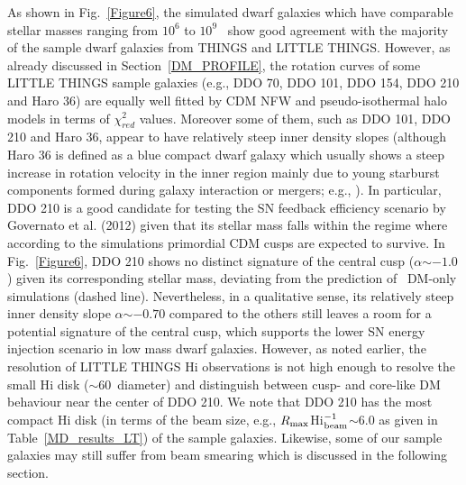 \documentclass[natbib209]{emulateapj}
\begin{document}
As shown in Fig.~\ref{Figure6}, the simulated dwarf galaxies which have
comparable stellar masses ranging from $10^6$ to $10^9$ \Msun\ show good
agreement with the majority of the sample dwarf galaxies from THINGS and LITTLE
THINGS. However, as already discussed in Section~\ref{DM_PROFILE}, the rotation curves of some LITTLE
THINGS sample galaxies (e.g., DDO 70, DDO 101, DDO 154, DDO 210 and Haro 36) are equally
well fitted by CDM NFW and pseudo-isothermal halo models in terms of
$\chi^{2}_{red}$ values. Moreover some of them, such as DDO 101, DDO 210 and Haro 36,
appear to have relatively steep inner density slopes (although Haro 36 is
defined as a blue compact dwarf galaxy which usually shows a steep increase in
rotation velocity in the inner region mainly due to young starburst components
formed during galaxy interaction or mergers; e.g., \citeauthor{Bekki_2008}
\citeyear{Bekki_2008}). In particular, DDO 210 is a good
candidate for testing the SN feedback efficiency scenario by Governato et al.
(2012) given that its stellar mass falls within the regime where according to
the simulations primordial CDM cusps are expected to survive.
In Fig.~\ref{Figure6}, DDO 210 shows
no distinct signature of the central cusp ($\alpha$$\sim$$-1.0$) given its corresponding
stellar mass, deviating from the prediction of \LCDM\ DM-only simulations
(dashed line). Nevertheless, in a qualitative sense, its relatively steep inner
density slope $\alpha$$\sim$$-0.70$ compared to the others still leaves a room for a
potential signature of the central cusp, which supports the lower SN energy
injection scenario in low mass dwarf galaxies. However, as noted earlier, the
resolution of LITTLE THINGS H{\sc i} observations is not high enough to 
resolve the small H{\sc i} disk ($\sim$60\arcsec\ diameter) and distinguish 
between cusp- and core-like DM behaviour near the center of DDO 210. 
We note that DDO 210 has the most compact H{\sc i} disk (in terms of the beam size,
e.g., $R_{\rm max}$H{\sc i}$_{\rm beam}^{-1}$$\sim$$6.0$ as given in
Table~\ref{MD_results_LT}) of the sample galaxies. Likewise, some of our sample
galaxies may still suffer from beam smearing which is discussed in the following section.
\end{document}
